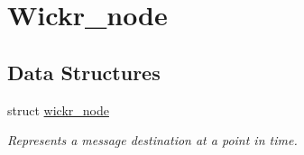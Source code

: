 \hypertarget{group__wickr__node}{}\section{Wickr\+\_\+node}
\label{group__wickr__node}
\subsection*{Data Structures}
\begin{DoxyCompactItemize}
\item 
struct \hyperlink{structwickr__node}{wickr\+\_\+node}
\begin{DoxyCompactList}\small\item\em Represents a message destination at a point in time. \end{DoxyCompactList}\end{DoxyCompactItemize}
